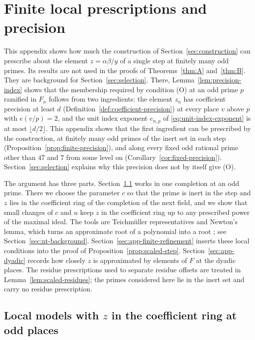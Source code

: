 \documentclass[11pt]{article}
\theoremstyle{plain}
\theoremstyle{definition}
\theoremstyle{remark}
\begin{document}
\appendix
\section{Finite local prescriptions and precision}\label{app:precision}

This appendix shows how much the construction of
Section~\ref{sec:construction} can prescribe about the element
$z=\alpha\beta/y$ of a single step at finitely many odd primes.  Its
results are not used in the proofs of Theorems~\ref{thm:A}
and~\ref{thm:B}.  They are background for Section~\ref{sec:selection}.
There, Lemma~\ref{lem:precision-index} shows that the membership required
by
condition (O) at an odd prime $p$ ramified in $F_n$ follows from two ingredients: the
element $z_n$ has coefficient precision at least $d$
(Definition~\ref{def:coefficient-precision}) at every place $v$ above $p$
with $e(v/p)=2$, and the unit index exponent $e_{n,p}$ of
\eqref{eq:unit-index-exponent} is at most $\lfloor d/2\rfloor$.  This appendix shows that the first
ingredient can be prescribed by the construction, at finitely many odd
primes of the inert set in each step
(Proposition~\ref{prop:finite-precision}), and along every fixed odd
rational prime other than $47$ and $7$ from some level on (Corollary~\ref{cor:fixed-precision}).
Section~\ref{sec:selection} explains why this precision does not by
itself give (O).

The argument has three parts.  Section~\ref{sec:app-local-models} works
in one completion at an odd prime.  There we choose the parameter $c$ so
that the prime is inert in the step and $z$ lies in the coefficient ring
of the completion of the next field, and we show that small changes of
$c$ and $u$ keep $z$ in the coefficient ring up to any prescribed power
of the maximal ideal.  The tools are Teichm\"uller representatives and
Newton's lemma, which turns an approximate root of a polynomial into a
root \cite[Theorem~7.32]{MilneANT}; see
Section~\ref{sec:nt-background}.  Section~\ref{sec:app-finite-refinement}
inserts these local conditions into the proof of
Proposition~\ref{prop:scaled-step}.  Section~\ref{sec:app-dyadic}
records how closely $z$ is approximated by elements of $F$ at the dyadic
places.  The residue prescriptions used to separate residue offsets are
treated in Lemma~\ref{lem:scaled-residues}; the primes considered here lie
in the inert set and carry no residue prescription.

\subsection{Local models with \texorpdfstring{$z$}{z} in the coefficient ring at odd places}\label{sec:app-local-models}
\end{document}
